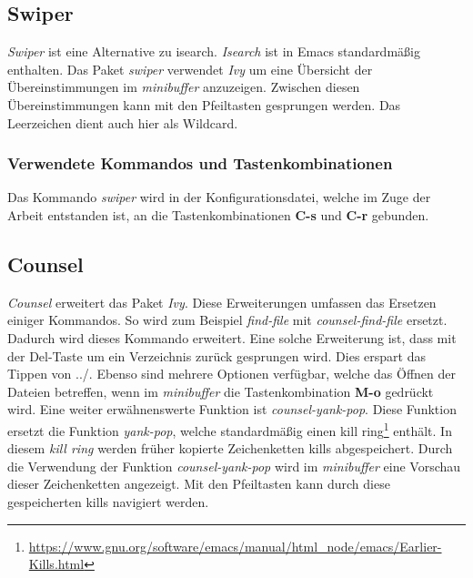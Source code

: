\subsection{Swiper}
\label{subsec:swiper}
\textit{Swiper} ist eine Alternative zu
       {\glqq}isearch{\grqq}. \textit{Isearch} ist in Emacs
       standardmäßig enthalten. Das Paket \textit{swiper} verwendet
       \textit{Ivy} um eine Übersicht der Übereinstimmungen im
       \textit{minibuffer} anzuzeigen. Zwischen diesen
       Übereinstimmungen kann mit den Pfeiltasten gesprungen
       werden. Das Leerzeichen dient auch hier als
       Wildcard. \cite{Swiper}\\

\subsubsection{Verwendete Kommandos und Tastenkombinationen}
Das Kommando \textit{swiper} wird in der Konfigurationsdatei, welche
im Zuge der Arbeit entstanden ist, an die Tastenkombinationen
\textbf{C-s} und \textbf{C-r} gebunden.\\

\subsection{Counsel}
\label{subsec:counsel}
\textit{Counsel} erweitert das Paket \textit{Ivy}. Diese Erweiterungen
umfassen das Ersetzen einiger Kommandos. So wird zum Beispiel
\textit{find-file} mit \textit{counsel-find-file} ersetzt. Dadurch
wird dieses Kommando erweitert. Eine solche Erweiterung ist, dass mit
der {\glqq}Del-Taste{\grqq} um ein Verzeichnis zurück gesprungen
wird. Dies erspart das Tippen von {\glqq}../{\grqq}. Ebenso sind
mehrere Optionen verfügbar, welche das Öffnen der Dateien betreffen,
wenn im \textit{minibuffer} die Tastenkombination \textbf{M-o}
gedrückt wird. Eine weiter erwähnenswerte Funktion ist
\textit{counsel-yank-pop}. Diese Funktion ersetzt die Funktion
\textit{yank-pop}, welche standardmäßig einen {\glqq}kill
ring{\grqq}\footnote{\url{https://www.gnu.org/software/emacs/manual/html_node/emacs/Earlier-Kills.html}}
enthält. In diesem \textit{kill ring} werden früher kopierte
Zeichenketten {\glqq}kills{\grqq} abgespeichert. Durch die Verwendung
der Funktion \textit{counsel-yank-pop} wird im \textit{minibuffer}
eine Vorschau dieser Zeichenketten angezeigt. Mit den Pfeiltasten kann
durch diese gespeicherten {\glqq}kills{\grqq} navigiert
werden. \cite{Counsel}\\

